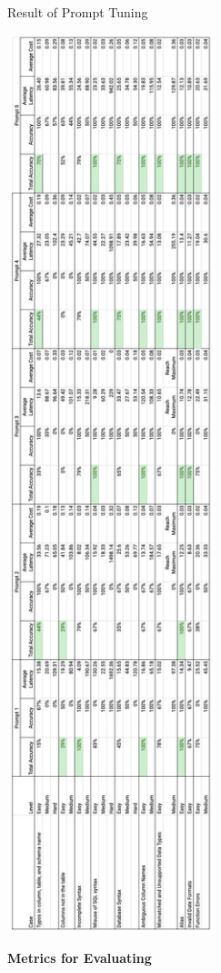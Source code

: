     \begin{table}[H]
        \centering
        \caption[Result of Prompt Tuning]{Result of Prompt Tuning}
        \label{fig:prompt-tuning}
        \includegraphics[width=6cm]{chapters/4/figures/prompt.png}
    \end{table}
    \textbf{Metrics for Evaluating}
